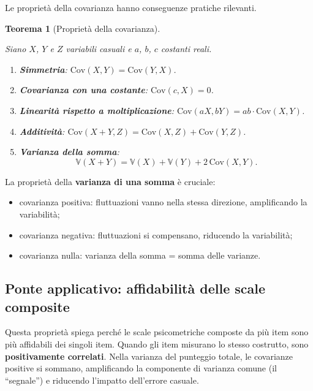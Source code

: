 \documentclass[
  italian,
  letterpaper,
  a4paper,
  11pt,
  open=any]{scrbook}
\providecommand{\tightlist}{%
  \setlength{\itemsep}{0pt}\setlength{\parskip}{0pt}}
\theoremstyle{plain}
\newtheorem{theorem}{Teorema}[chapter]
\theoremstyle{definition}
\theoremstyle{definition}
\theoremstyle{remark}
\begin{document}
Le proprietà della covarianza hanno conseguenze pratiche rilevanti.

\begin{theorem}[Proprietà della
covarianza]\protect\hypertarget{thm-cov-properties}{}\label{thm-cov-properties}

Siano \(X\), \(Y\) e \(Z\) variabili casuali e \(a\), \(b\), \(c\)
costanti reali.

\begin{enumerate}
\def\labelenumi{\arabic{enumi}.}
\tightlist
\item
  \textbf{Simmetria}: \(\text{Cov}(X, Y) = \text{Cov}(Y, X)\).
\item
  \textbf{Covarianza con una costante}: \(\text{Cov}(c, X) = 0\).
\item
  \textbf{Linearità rispetto a moltiplicazione}:
  \(\text{Cov}(aX, bY) = ab \cdot \text{Cov}(X, Y)\).
\item
  \textbf{Additività}:
  \(\text{Cov}(X + Y, Z) = \text{Cov}(X, Z) + \text{Cov}(Y, Z)\).
\item
  \textbf{Varianza della somma}: \[
  \mathbb{V}(X + Y) = \mathbb{V}(X) + \mathbb{V}(Y) + 2\,\text{Cov}(X, Y).
  \]
\end{enumerate}

\end{theorem}

La proprietà della \textbf{varianza di una somma} è cruciale:

\begin{itemize}
\tightlist
\item
  covarianza positiva: fluttuazioni vanno nella stessa direzione,
  amplificando la variabilità;
\item
  covarianza negativa: fluttuazioni si compensano, riducendo la
  variabilità;
\item
  covarianza nulla: varianza della somma = somma delle varianze.
\end{itemize}

\subsection{Ponte applicativo: affidabilità delle scale
composite}\label{ponte-applicativo-affidabilituxe0-delle-scale-composite}

Questa proprietà spiega perché le scale psicometriche composte da più
item sono più affidabili dei singoli item. Quando gli item misurano lo
stesso costrutto, sono \textbf{positivamente correlati}. Nella varianza
del punteggio totale, le covarianze positive si sommano, amplificando la
componente di varianza comune (il ``segnale'') e riducendo l'impatto
dell'errore casuale.
\end{document}
